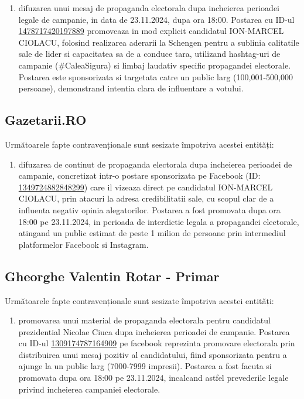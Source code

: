 \documentclass[a4paper,12pt]{article}
\begin{document}
\begin{enumerate}[leftmargin=*, label=\arabic*.)]
    \item difuzarea unui mesaj de propaganda electorala dupa incheierea perioadei legale de campanie, in data de 23.11.2024, dupa ora 18:00. Postarea cu ID-ul \href{https://www.facebook.com/ads/library/?id=1478717420197889}{1478717420197889} promoveaza in mod explicit candidatul ION-MARCEL CIOLACU, folosind realizarea aderarii la Schengen pentru a sublinia calitatile sale de lider si capacitatea sa de a conduce tara, utilizand hashtag-uri de campanie (\#CaleaSigura) si limbaj laudativ specific propagandei electorale. Postarea este sponsorizata si targetata catre un public larg (100,001-500,000 persoane), demonstrand intentia clara de influentare a votului.
\end{enumerate}

\vspace{0.5cm}

\subsection{Gazetarii.RO}
Următoarele fapte contravenționale sunt sesizate împotriva acestei entități:

\begin{enumerate}[leftmargin=*, label=\arabic*.)]
    \item difuzarea de continut de propaganda electorala dupa incheierea perioadei de campanie, concretizat intr-o postare sponsorizata pe Facebook (ID: \href{https://www.facebook.com/ads/library/?id=1349724882848299}{1349724882848299}) care il vizeaza direct pe candidatul ION-MARCEL CIOLACU, prin atacuri la adresa credibilitatii sale, cu scopul clar de a influenta negativ opinia alegatorilor. Postarea a fost promovata dupa ora 18:00 pe 23.11.2024, in perioada de interdictie legala a propagandei electorale, atingand un public estimat de peste 1 milion de persoane prin intermediul platformelor Facebook si Instagram.
\end{enumerate}

\vspace{0.5cm}

\subsection{Gheorghe Valentin Rotar - Primar}
Următoarele fapte contravenționale sunt sesizate împotriva acestei entități:

\begin{enumerate}[leftmargin=*, label=\arabic*.)]
    \item promovarea unui material de propaganda electorala pentru candidatul prezidential Nicolae Ciuca dupa incheierea perioadei de campanie. Postarea cu ID-ul \href{https://www.facebook.com/ads/library/?id=1309174787164909}{1309174787164909} pe facebook reprezinta promovare electorala prin distribuirea unui mesaj pozitiv al candidatului, fiind sponsorizata pentru a ajunge la un public larg (7000-7999 impresii). Postarea a fost facuta si promovata dupa ora 18:00 pe 23.11.2024, incalcand astfel prevederile legale privind incheierea campaniei electorale.
\end{enumerate}
\end{document}

